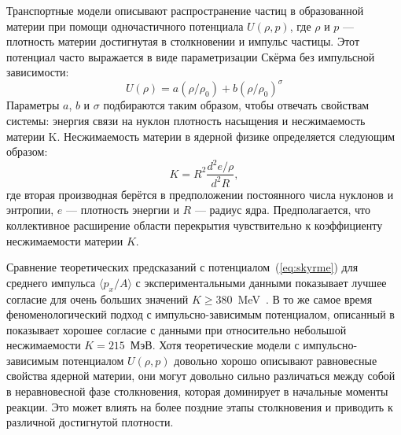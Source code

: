 Транспортные модели описывают распространение частиц в образованной материи при помощи одночастичного потенциала $U(\rho, p)$, где $\rho$ и $p$ --- плотность материи достигнутая в столкновении и импульс частицы.
Этот потенциал часто выражается в виде параметризации Скёрма без импульсной зависимости:
\begin{equation}
    U(\rho) = a(\rho/\rho_0) + b(\rho/\rho_0)^\sigma
    \label{eq:skyrme}
\end{equation}
Параметры $a$, $b$ и $\sigma$ подбираются таким образом, чтобы отвечать свойствам системы: энергия связи на нуклон плотность насыщения и несжимаемость материи K.
Несжимаемость материи в ядерной физике определяется следующим образом:
\begin{equation}
    K = R^2 \frac{d^2 e/\rho}{ d^2 R },
\end{equation}
где вторая производная берётся в предположении постоянного числа нуклонов и энтропии, $e$ --- плотность энергии и $R$ --- радиус ядра.
Предполагается, что коллективное расширение области перекрытия чувствительно к коэффициенту несжимаемости материи $K$.

Сравнение теоретических предсказаний с потенциалом~(\ref{eq:skyrme}) для среднего импульса $\langle p_x / A \rangle$ с экспериментальными данными показывает лучшее согласие для очень больших значений $K \ge 380$~MeV~\cite{Kruse:1985hy, Molitoris:1985gs}.
В то же самое время феноменологический подход с импульсно-зависимым потенциалом, описанный в~\cite{Gale:1987zz, Aichelin:1987ti, Welke:1988zz, Haddad:1995vt} показывает хорошее согласие с данными при относительно небольшой несжимаемости $K=215$~МэВ.
Хотя теоретические модели с импульсно-зависимым потенциалом $U(\rho, p)$ довольно хорошо описывают равновесные свойства ядерной материи, они могут довольно сильно различаться между собой в неравновесной фазе столкновения, которая доминирует в начальные моменты реакции.
Это может влиять на более поздние этапы столкновения и приводить к различной достигнутой плотности.

